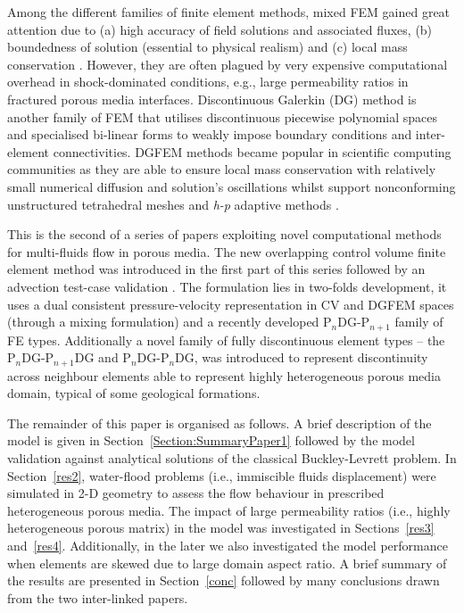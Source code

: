 \documentclass[preprint,authoryear,12pt]{elsarticle}
\newcommand{\PN}[2][error]{P$_{#1}$DG-P$_{#2}$}
\begin{document}
Among the different families of finite element methods, mixed FEM gained great attention due to (a) high accuracy of field solutions and associated fluxes, (b) boundedness of solution (essential to physical realism) and (c) local mass conservation \citep[within an element,][]{fung_1992,durlofsky_1993,durlofsky_1994}. However, they are often plagued by very expensive computational overhead in shock-dominated conditions, e.g., large permeability ratios in fractured porous media interfaces. Discontinuous Galerkin (DG) method is another family of FEM that utilises discontinuous piecewise polynomial spaces and specialised bi-linear forms to weakly impose boundary conditions and inter-element connectivities.  DGFEM methods became popular in scientific computing communities as they are able to ensure local mass conservation with relatively small numerical diffusion and solution's oscillations whilst support nonconforming unstructured tetrahedral meshes and {\it h-p} adaptive methods \citep{merton_2012,brooks_1982}. 




This is the second of a series of papers exploiting novel computational methods for multi-fluids flow in porous media. The new overlapping control volume finite element method was introduced in the first part of this series followed by an advection test-case validation \citep{gomes_2013}. The formulation lies in two-folds development, it uses a dual consistent pressure-velocity representation in CV and DGFEM spaces (through a mixing formulation) and a recently developed \PN[n]{n+1} family of FE types. Additionally a novel family of fully discontinuous element types -- the \PN[n]{n+1}DG and \PN[n]{n}DG, was introduced to represent discontinuity across neighbour elements able to represent highly heterogeneous porous media domain, typical of some geological formations.

The remainder of this paper is organised as follows. A brief description of the model is given in Section~\ref{Section:SummaryPaper1} followed by the model validation against analytical solutions of the classical Buckley-Levrett problem. In Section~\ref{res2}, water-flood problems (i.e., immiscible fluids displacement) were simulated in 2-D geometry to assess the flow behaviour in prescribed heterogeneous porous media. The impact of large permeability ratios (i.e., highly heterogeneous porous matrix) in the model was investigated in Sections~\ref{res3} and~\ref{res4}. Additionally, in the later we also investigated the model performance when elements are skewed due to large domain aspect ratio. A brief summary of the results are presented in Section~\ref{conc} followed by many conclusions drawn from the two inter-linked papers. 
\end{document}
